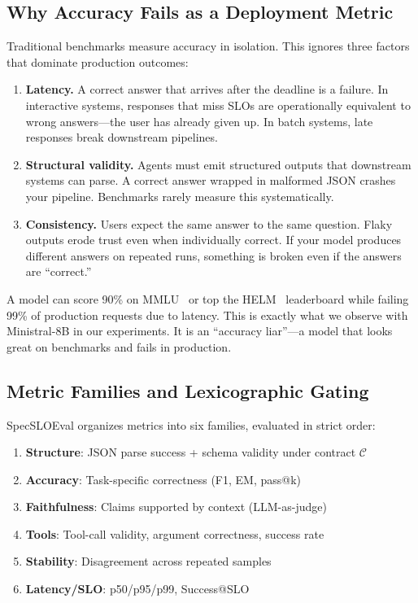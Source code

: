 \documentclass[11pt]{article}
\begin{document}
\subsection{Why Accuracy Fails as a Deployment Metric}

Traditional benchmarks measure accuracy in isolation.
This ignores three factors that dominate production outcomes:

\begin{enumerate}[leftmargin=12pt]
    \item \textbf{Latency.} A correct answer that arrives after the deadline is a failure. In interactive systems, responses that miss SLOs are operationally equivalent to wrong answers---the user has already given up. In batch systems, late responses break downstream pipelines.

    \item \textbf{Structural validity.} Agents must emit structured outputs that downstream systems can parse. A correct answer wrapped in malformed JSON crashes your pipeline. Benchmarks rarely measure this systematically.

    \item \textbf{Consistency.} Users expect the same answer to the same question. Flaky outputs erode trust even when individually correct. If your model produces different answers on repeated runs, something is broken even if the answers are ``correct.''
\end{enumerate}

A model can score 90\% on MMLU~\citep{hendrycks2021mmlu} or top the HELM~\citep{liang2022helm} leaderboard while failing 99\% of production requests due to latency.
This is exactly what we observe with Ministral-8B in our experiments.
It is an ``accuracy liar''---a model that looks great on benchmarks and fails in production.

\subsection{Metric Families and Lexicographic Gating}

SpecSLOEval organizes metrics into six families, evaluated in strict order:

\begin{enumerate}[leftmargin=12pt]
    \item \textbf{Structure}: JSON parse success + schema validity under contract $\mathcal{C}$
    \item \textbf{Accuracy}: Task-specific correctness (F1, EM, pass@k)
    \item \textbf{Faithfulness}: Claims supported by context (LLM-as-judge)
    \item \textbf{Tools}: Tool-call validity, argument correctness, success rate
    \item \textbf{Stability}: Disagreement across repeated samples
    \item \textbf{Latency/SLO}: p50/p95/p99, Success@SLO
\end{enumerate}
\end{document}
